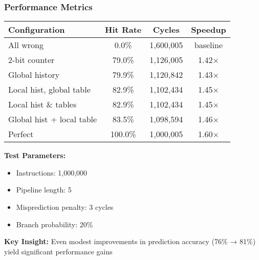 \documentclass[aspectratio=169,12pt]{beamer}
\begin{document}
\begin{frame}
  \frametitle{Performance Metrics}
  
  \begin{center}
    \footnotesize
    \begin{tabular}{|l|c|c|c|}
      \hline
      \textbf{Configuration} & \textbf{Hit Rate} & \textbf{Cycles} & \textbf{Speedup} \\
      \hline
      All wrong & 0.0\% & 1,600,005 & baseline \\
      2-bit counter & 79.0\% & 1,126,005 & 1.42$\times$ \\
      Global history & 79.9\% & 1,120,842 & 1.43$\times$ \\
      Local hist, global table & 82.9\% & 1,102,434 & 1.45$\times$ \\
      Local hist \& tables & 82.9\% & 1,102,434 & 1.45$\times$ \\
      Global hist + local table & 83.5\% & 1,098,594 & 1.46$\times$ \\
      Perfect & 100.0\% & 1,000,005 & 1.60$\times$ \\
      \hline
    \end{tabular}
  \end{center}
  
  \vspace{1em}
  
  \begin{tcolorbox}[colback=yellow!10, colframe=yellow!50]
    \textbf{Test Parameters:}
    \begin{itemize}
      \item Instructions: 1,000,000
      \item Pipeline length: 5
      \item Misprediction penalty: 3 cycles
      \item Branch probability: 20\%
    \end{itemize}
  \end{tcolorbox}
  
  \textbf{Key Insight:} Even modest improvements in prediction accuracy (76\% → 81\%) yield significant performance gains
\end{frame}
\end{document}
